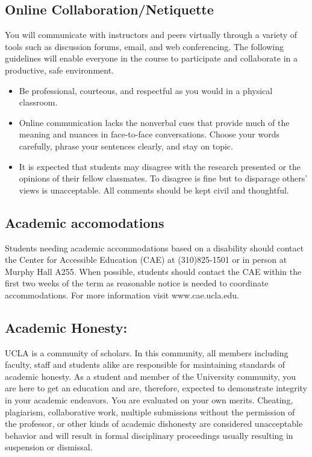 \documentclass[11pt,]{article}
\providecommand{\tightlist}{%
  \setlength{\itemsep}{0pt}\setlength{\parskip}{0pt}}
\begin{document}
\subsection{Online
Collaboration/Netiquette}\label{online-collaborationnetiquette}

You will communicate with instructors and peers virtually through a
variety of tools such as discussion forums, email, and web conferencing.
The following guidelines will enable everyone in the course to
participate and collaborate in a productive, safe environment.

\begin{itemize}
\tightlist
\item
  Be professional, courteous, and respectful as you would in a physical
  classroom.
\item
  Online communication lacks the nonverbal cues that provide much of the
  meaning and nuances in face-to-face conversations. Choose your words
  carefully, phrase your sentences clearly, and stay on topic.
\item
  It is expected that students may disagree with the research presented
  or the opinions of their fellow classmates. To disagree is fine but to
  disparage others' views is unacceptable. All comments should be kept
  civil and thoughtful.
\end{itemize}

\subsection{Academic accomodations}\label{academic-accomodations}

Students needing academic accommodations based on a disability should
contact the Center for Accessible Education (CAE) at (310)825-1501 or in
person at Murphy Hall A255. When possible, students should contact the
CAE within the first two weeks of the term as reasonable notice is
needed to coordinate accommodations. For more information visit
www.cae.ucla.edu.

\subsection{Academic Honesty:}\label{academic-honesty}

UCLA is a community of scholars. In this community, all members
including faculty, staff and students alike are responsible for
maintaining standards of academic honesty. As a student and member of
the University community, you are here to get an education and are,
therefore, expected to demonstrate integrity in your academic endeavors.
You are evaluated on your own merits. Cheating, plagiarism,
collaborative work, multiple submissions without the permission of the
professor, or other kinds of academic dishonesty are considered
unacceptable behavior and will result in formal disciplinary proceedings
usually resulting in suspension or dismissal.
\end{document}
